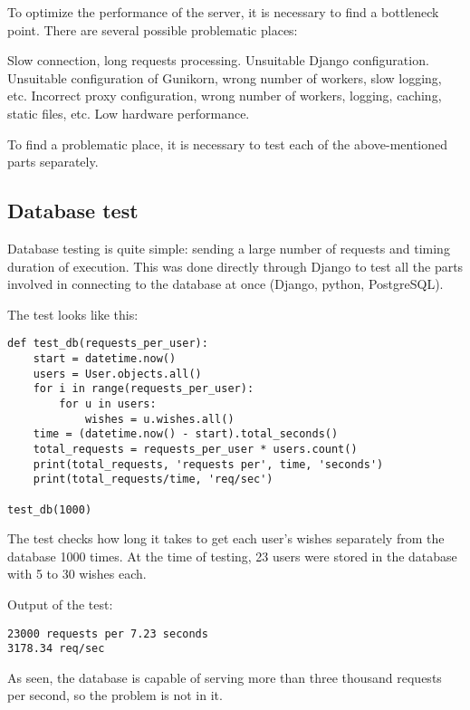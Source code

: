 To optimize the performance of the server, it is necessary to find a bottleneck point. There are several possible
problematic places:

\begin{itemize}
 Slow connection, long requests processing.
 Unsuitable Django configuration.
 Unsuitable configuration of Gunikorn, wrong number of workers, slow logging, etc.
 Incorrect proxy configuration, wrong number of workers, logging, caching, static files, etc.
 Low hardware performance.
\end{itemize}


To find a problematic place, it is necessary to test each of the above-mentioned parts separately.

\subsection{Database test}
Database testing is quite simple: sending a large number of requests and timing duration of execution. This was done
directly through Django to test all the parts involved in connecting to the database at once (Django, python,
PostgreSQL).

The test looks like this:

\begin{lstlisting}
def test_db(requests_per_user):
    start = datetime.now()
    users = User.objects.all()
    for i in range(requests_per_user):
        for u in users:
            wishes = u.wishes.all()
    time = (datetime.now() - start).total_seconds()
    total_requests = requests_per_user * users.count()
    print(total_requests, 'requests per', time, 'seconds')
    print(total_requests/time, 'req/sec')

test_db(1000)
\end{lstlisting}

The test checks how long it takes to get each user's wishes separately from the database 1000 times. At the time of
testing, 23 users were stored in the database with 5 to 30 wishes each.

Output of the test:

\begin{lstlisting}
23000 requests per 7.23 seconds
3178.34 req/sec
\end{lstlisting}

As seen, the database is capable of serving more than three thousand requests per second, so the problem is not in it.


